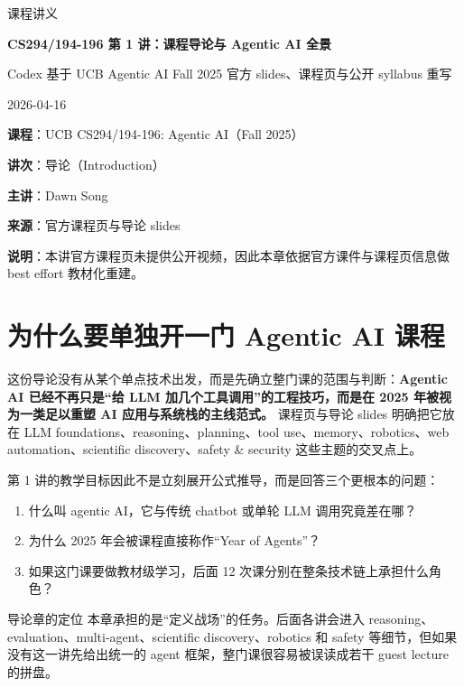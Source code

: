 \documentclass[a4paper]{article}
\newcommand{\notetitle}{CS294/194-196 第 1 讲：课程导论与 Agentic AI 全景}
\newcommand{\noteauthors}{Codex 基于 UCB Agentic AI Fall 2025 官方 slides、课程页与公开 syllabus 重写}
\newcommand{\notedate}{2026-04-16}
\begin{document}
\begin{titlepage}
\centering
{\Large 课程讲义\par}
\vspace{1.2cm}
{\huge\bfseries \notetitle\par}
\vspace{0.8cm}
{\large \noteauthors\par}
\vspace{0.3cm}
{\large \notedate\par}
\vfill
\begin{tcolorbox}[width=0.9\textwidth, colback=black!2!white, colframe=black!60, sharp corners]
\textbf{课程}：UCB CS294/194-196: Agentic AI（Fall 2025）\par
\textbf{讲次}：导论（Introduction）\par
\textbf{主讲}：Dawn Song\par
\textbf{来源}：官方课程页与导论 slides\par
\textbf{说明}：本讲官方课程页未提供公开视频，因此本章依据官方课件与课程页信息做 best effort 教材化重建。
\end{tcolorbox}
\end{titlepage}

\tableofcontents
\newpage

\section{为什么要单独开一门 Agentic AI 课程}
这份导论没有从某个单点技术出发，而是先确立整门课的范围与判断：\textbf{Agentic AI 已经不再只是“给 LLM 加几个工具调用”的工程技巧，而是在 2025 年被视为一类足以重塑 AI 应用与系统栈的主线范式。} 课程页与导论 slides 明确把它放在 LLM foundations、reasoning、planning、tool use、memory、robotics、web automation、scientific discovery、safety \& security 这些主题的交叉点上。

第 1 讲的教学目标因此不是立刻展开公式推导，而是回答三个更根本的问题：
\begin{enumerate}[leftmargin=1.5em]
\item 什么叫 agentic AI，它与传统 chatbot 或单轮 LLM 调用究竟差在哪？
\item 为什么 2025 年会被课程直接称作“Year of Agents”？
\item 如果这门课要做教材级学习，后面 12 次课分别在整条技术链上承担什么角色？
\end{enumerate}

\begin{importantbox}{导论章的定位}
本章承担的是“定义战场”的任务。后面各讲会进入 reasoning、evaluation、multi-agent、scientific discovery、robotics 和 safety 等细节，但如果没有这一讲先给出统一的 agent 框架，整门课很容易被误读成若干 guest lecture 的拼盘。
\end{importantbox}
\end{document}
